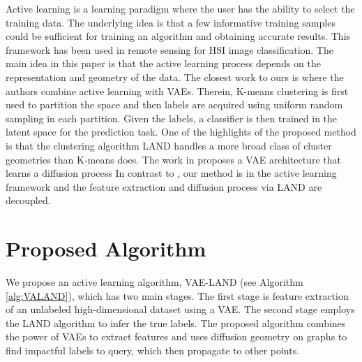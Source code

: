 \documentclass{article}
\begin{document}
Active learning is a learning paradigm where the user has the ability to select the training data\cite{cohn1995active,mackay1992information}.  The underlying idea is that a few informative training samples could be sufficient for training an algorithm and obtaining accurate results. This framework has been used in remote sensing for HSI image classification\cite{liu2016active,wang2017novel,murphy2018iterative,tuia2009active}.  The main idea in this paper is that the active learning process depends on the representation and geometry of the data. The closest work to ours is  \cite{pourkamali2019effectiveness} where the authors combine active learning with VAEs. Therein, K-means clustering is first used to partition the space and then labels are acquired using uniform random sampling in each partition. Given the labels, a classifier is then trained in the latent space for the prediction task. One of the highlights of the proposed method is that the clustering algorithm LAND handles a more broad class of cluster geometries than K-means does. The work in \cite{li2020variational} proposes a VAE architecture that learns a diffusion process 
In contrast to   \cite{li2020variational}, our method is in the active learning framework and the feature extraction
and diffusion process via LAND are decoupled. 

\section{Proposed Algorithm}
\label{sec:ProposedAlgorithm}
We propose an active learning algorithm, VAE-LAND (see Algorithm \ref{alg:VALAND}), which has two main stages. The first stage is feature extraction of an unlabeled high-dimensional dataset using a VAE. The second stage employs the LAND algorithm to infer the true labels.  The proposed algorithm combines the power of VAEs to extract features and uses diffusion geometry on graphs to find impactful labels to query, which then propagate to other points. 

\end{document}
